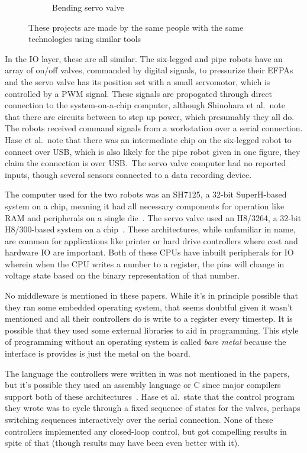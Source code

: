 \documentclass[english,12pt,a4paper,pdftex,eng,utf8]{aaltothesis}
\begin{document}
\begin{figure}[h]
\begin{subfigure}[t]{0.29\textwidth}
    \caption{Bending servo valve~\cite{Kobayashi2020}}\label{sfig:bending_servo_valve}
  \end{subfigure}
  \caption{These projects are made by the same people with the same technologies using similar tools}\label{fig:soft_pneumatic_actuators_demo}
\end{figure}

In the IO layer, these are all similar.  The six-legged and pipe robots have an array of on/off valves, commanded by digital signals, to pressurize their EFPAs and the servo valve has its position set with a small servomotor, which is controlled by a PWM signal.  These signals are propogated through direct connection to the system-on-a-chip computer, although Shinohara et al.\ note that there are circuits between to step up power, which presumably they all do.  The robots received command signals from a workstation over a serial connection.  Hase et al.\ note that there was an intermediate chip on the six-legged robot to connect over USB, which is also likely for the pipe robot given in one figure, they claim the connection is over USB.\  The servo valve computer had no reported inputs, though several sensors connected to a data recording device.

The computer used for the two robots was an SH7125, a 32-bit SuperH-based system on a chip, meaning it had all necessary components for operation like RAM and peripherals on a single die~\cite{SH7125}.  The servo valve used an H8/3264, a 32-bit H8/300-based system on a chip~\cite{H83264}.  These architectures, while unfamiliar in name, are common for applications like printer or hard drive controllers where cost and hardware IO are important.  Both of these CPUs have inbuilt peripherals for IO wherein when the CPU writes a number to a register, the pins will change in voltage state based on the binary representation of that number.

No middleware is mentioned in these papers.  While it's in principle possible that they ran some embedded operating system, that seems doubtful given it wasn't mentioned and all their controllers do is write to a register every timestep.  It is possible that they used some external libraries to aid in programming.  This style of programming without an operating system is called {\it bare metal\/} because the interface is provides is just the metal on the board.

The language the controllers were written in was not mentioned in the papers, but it's possible they used an assembly language or C since major compilers support both of these architectures~\cite{GccSupportedArchitectures}.  Hase et al.\ state that the control program they wrote was to cycle through a fixed sequence of states for the valves, perhaps switching sequences interactively over the serial connection.  None of these controllers implemented any closed-loop control, but got compelling results in spite of that (though results may have been even better with it).
\end{document}
